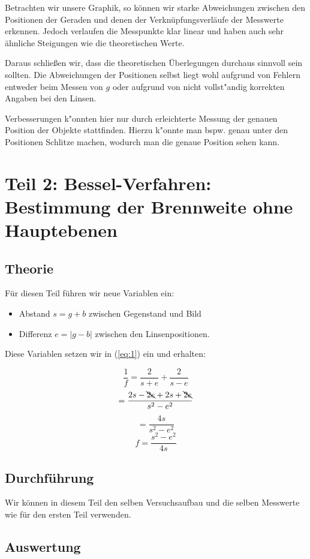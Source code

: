 \documentclass[11pt,a4paper]{article}
\begin{document}
Betrachten wir unsere Graphik, so k\"onnen wir starke Abweichungen zwischen den Positionen der Geraden und denen der Verkn\"upfungsverl\"aufe der Messwerte erkennen. Jedoch verlaufen die Messpunkte klar linear und haben auch sehr \"ahnliche Steigungen wie die theoretischen Werte. 

Daraus schlie\ss en wir, dass die theoretischen \"Uberlegungen durchaus sinnvoll sein sollten. Die Abweichungen der Positionen selbst liegt wohl aufgrund von Fehlern entweder beim Messen von $g$ oder aufgrund von nicht vollst"andig korrekten Angaben bei den Linsen.

Verbesserungen k"onnten hier nur durch erleichterte Messung der genauen Position der Objekte stattfinden. Hierzu k"onnte man bspw. genau unter den Positionen Schlitze machen, wodurch man die genaue Position sehen kann.

\section{Teil 2: Bessel-Verfahren: Bestimmung der Brennweite ohne Hauptebenen}

\subsection{Theorie}

F\"ur diesen Teil f\"uhren wir neue Variablen ein:
\begin{itemize}
\item Abstand $s=g+b$ zwischen Gegenstand und Bild
\item Differenz $e=|g-b|$ zwischen den Linsenpositionen.
\end{itemize}

Diese Variablen setzen wir in (\ref{eq:1}) ein und erhalten:

\[
\frac{1}{f}=\frac{2}{s+e}+\frac{2}{s-e}
\]
\[
=\frac{2s-\bcancel{2e}+2s+\bcancel{2e}}{s^2-e^2}
\]
\[=\frac{4s}{s^2-e^2}\]
\begin{equation}
f=\frac{s^2-e^2}{4s}\label{eq:3}
\end{equation}

\subsection{Durchführung}

Wir k\"onnen in diesem Teil den selben Versuchsaufbau und die selben Messwerte wie f\"ur den ersten Teil verwenden.

\subsection{Auswertung}
\end{document}
